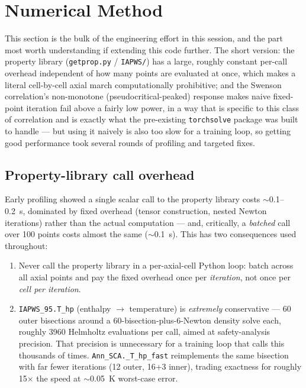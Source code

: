 \documentclass[11pt]{article}
\begin{document}
\section{Numerical Method}
\label{sec:numerics}

This section is the bulk of the engineering effort in this session, and
the part most worth understanding if extending this code further. The
short version: the property library (\texttt{getprop.py} /
\texttt{IAPWS/}) has a large, roughly constant per-call overhead
independent of how many points are evaluated at once, which makes a
literal cell-by-cell axial march computationally prohibitive; and the
Swenson correlation's non-monotone (pseudocritical-peaked) response makes
naive fixed-point iteration fail above a fairly low power, in a way that
is specific to this class of correlation and is exactly what the
pre-existing \texttt{torchsolve} package was built to handle --- but using
it naively is also too slow for a training loop, so getting good
performance took several rounds of profiling and targeted fixes.

\subsection{Property-library call overhead}

Early profiling showed a single scalar call to the property library costs
$\sim$0.1--0.2~s, dominated by fixed overhead (tensor construction, nested
Newton iterations) rather than the actual computation --- and, critically,
a \emph{batched} call over 100 points costs almost the same
($\sim$0.1~s). This has two consequences used throughout:
\begin{enumerate}
\item Never call the property library in a per-axial-cell Python loop:
batch across all axial points and pay the fixed overhead once per
\emph{iteration}, not once per \emph{cell per iteration}.
\item \texttt{IAPWS\_95.T\_hp} (enthalpy $\to$ temperature) is
\emph{extremely} conservative --- 60 outer bisections around a
60-bisection-plus-6-Newton density solve each, roughly 3960 Helmholtz
evaluations per call, aimed at safety-analysis precision. That precision
is unnecessary for a training loop that calls this thousands of times.
\texttt{Ann\_SCA.\_T\_hp\_fast} reimplements the same bisection with far
fewer iterations (12 outer, 16+3 inner), trading exactness for roughly
15$\times$ the speed at $\sim$0.05~K worst-case error.
\end{enumerate}
\end{document}
